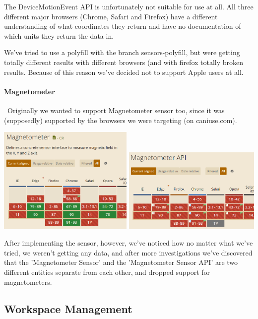 The DeviceMotionEvent API is unfortunately not suitable for use at all. All three different major browsers (Chrome, Safari and Firefox) have a different understanding of what coordinates they return and have no documentation of which units they return the data in.

We've tried to use a polyfill with the branch sensors-polyfill, but were getting totally different results with different browsers (and with firefox totally broken results. Because of this reason we've decided not to support Apple users at all.

\paragraph{Magnetometer} \
Originally we wanted to support Magnetometer sensor too, since it was (supposedly) supported by the browsers we were targeting (on caniuse.com).
\begin{center}
    \includegraphics[width=0.49\textwidth]{images/magneto1.png}
    \includegraphics[width=0.5\textwidth]{images/magneto2.png}
\end{center}

After implementing the sensor, however, we've noticed how no matter what we've tried, we weren't getting any data, and after more investigations we've discovered that the 'Magnetometer Sensor' and the 'Magnetometer Sensor API' are two different entities separate from each other, and dropped support for magnetometers.

\subsection{Workspace Management}
